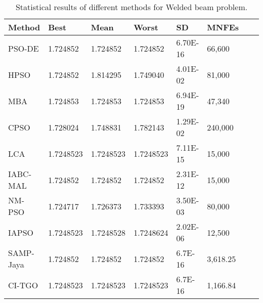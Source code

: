 
\begin{table*}[tp]
    \tiny
\begin{center}

\begin{tabular}{ P{2.0cm} P{2.0cm} P{2.0cm} P{2.0cm} P{2.0cm} P{2.0cm} P{2.0cm} P{2.0cm}  }
\hline
\textbf{Method} & \textbf{Best} & \textbf{Mean} & \textbf{Worst} & \textbf{SD} & \textbf{MNFEs} \\
\hline
PSO-DE & 1.724852 & 1.724852 & 1.724852 & 6.70E-16 & 66,600 \\
HPSO & 1.724852 & 1.814295 & 1.749040 & 4.01E-02 & 81,000 \\
MBA & 1.724853 & 1.724853 & 1.724853 & 6.94E-19 & 47,340 \\
CPSO & 1.728024 & 1.748831 & 1.782143 & 1.29E-02 & 240,000 \\
LCA & 1.7248523 & 1.7248523 & 1.7248523 & 7.11E-15 & 15,000 \\
IABC-MAL & 1.724852 & 1.724852 & 1.724852 & 2.31E-12 & 15,000 \\
NM-PSO & 1.724717 & 1.726373 & 1.733393 & 3.50E-03 & 80,000 \\
IAPSO & 1.7248523 & 1.7248528 & 1.7248624 & 2.02E-06 & 12,500 \\
SAMP-Jaya & 1.724852 & 1.724852 & 1.724852 & 6.7E-16 & 3,618.25 \\
CI-TGO & 1.7248523 & 1.7248523 & 1.7248523 & 6.7E-16 & 1,166.84 \\


\hline
\end{tabular}
\end{center}

\caption{ Statistical results of different methods for Welded beam problem. \\[1em]}
\label{tab:WB}
\end{table*}

